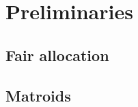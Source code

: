 \section{Preliminaries}

\subsection*{Fair allocation}
\skelpars[12]

\subsection*{Matroids}
\skelpars[6]